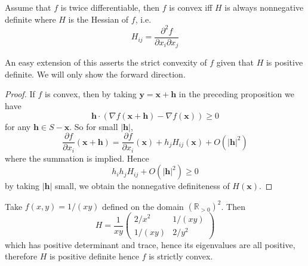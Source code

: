 \documentclass[a4paper]{article}
\begin{document}
\begin{proposition}
    Assume that $f$ is twice differentiable, then $f$ is convex iff $H$ is always nonnegative definite where $H$ is the Hessian of $f$, i.e.
    $$H_{ij}=\frac{\partial^2f}{\partial x_i\partial x_j}$$
\end{proposition}
An easy extension of this asserts the strict convexity of $f$ given that $H$ is positive definite.
We will only show the forward direction.
\begin{proof}
    If $f$ is convex, then by taking $\mathbf{y}=\mathbf{x}+\mathbf{h}$ in the preceding proposition we have
    $$\mathbf{h}\cdot(\nabla f(\mathbf{x}+\mathbf{h})-\nabla f(\mathbf{x}))\ge 0$$
    for any $\mathbf{h}\in S-\mathbf{x}$.
    So for small $|\mathbf{h}|$,
    $$\frac{\partial f}{\partial x_i}(\mathbf{x}+\mathbf{h})=\frac{\partial f}{\partial x_i}(\mathbf{x})+h_jH_{ij}(\mathbf{x})+O(|\mathbf{h}|^2)$$
    where the summation is implied.
    Hence
    $$h_ih_jH_{ij}+O(|\mathbf{h}|^2)\ge 0$$
    by taking $|\mathbf{h}|$ small, we obtain the nonnegative definiteness of $H(\mathbf{x})$.
\end{proof}
\begin{example}
    Take $f(x,y)=1/(xy)$ defined on the domain $(\mathbb R_{>0})^2$.
    Then
    $$H=\frac{1}{xy}\begin{pmatrix}
        2/x^2&1/(xy)\\
        1/(xy)&2/y^2
    \end{pmatrix}$$
    which has positive determinant and trace, hence its eigenvalues are all positive, therefore $H$ is positive definite hence $f$ is strictly convex.
\end{example}
\end{document}
